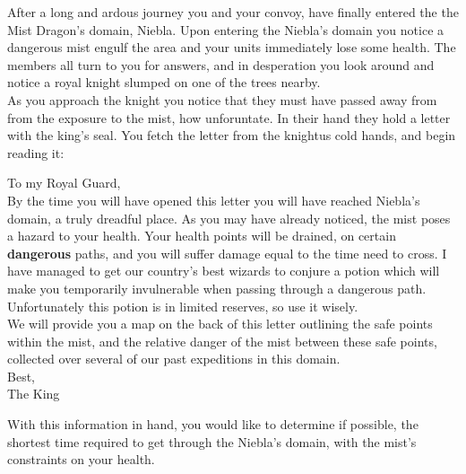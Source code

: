 


\noindent After a long and ardous journey you and your convoy, have finally entered the the Mist Dragon's domain,
Niebla. Upon entering the Niebla's domain you notice a dangerous mist engulf the area and your units immediately lose
some health. The members all turn to you for answers, and in desperation you look around and notice a royal knight
slumped on one of the trees nearby. \\

\noindent As you approach the knight you notice that they must have passed away from from the exposure to the mist, how
unforuntate. In their hand they hold a letter with the king's seal. You fetch the letter from the knightus cold hands,
and begin reading it: \\

\begin{minipage}[t]{6in}
To my Royal Guard, \\

By the time you will have opened this letter you will have reached Niebla's domain, a truly dreadful place. As you may
have already noticed, the mist poses a hazard to your health. Your health points will be drained, on certain
\textbf{dangerous} paths, and you will suffer damage equal to the time need to cross. I have managed to get our
country's best wizards to conjure a potion which will make you temporarily invulnerable when passing through a dangerous
path. Unfortunately this potion is in limited reserves, so use it wisely. \\

We will provide you a map on the back of this letter outlining the safe points within the mist, and the relative danger
of the mist between these safe points, collected over several of our past expeditions in this domain.\\

Best,\\
The King \\
\end{minipage}



\noindent With this information in hand, you would like to determine if possible,  the shortest time required to get
through the Niebla's domain, with the mist's constraints on your health. \\

